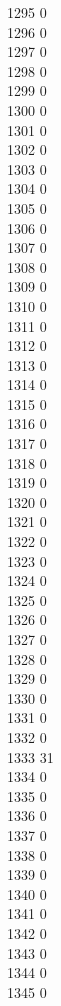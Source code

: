 { 1295	0 \\
 1296	0 \\
 1297	0 \\
 1298	0 \\
 1299	0 \\
 1300	0 \\
 1301	0 \\
 1302	0 \\
 1303	0 \\
 1304	0 \\
 1305	0 \\
 1306	0 \\
 1307	0 \\
 1308	0 \\
 1309	0 \\
 1310	0 \\
 1311	0 \\
 1312	0 \\
 1313	0 \\
 1314	0 \\
 1315	0 \\
 1316	0 \\
 1317	0 \\
 1318	0 \\
 1319	0 \\
 1320	0 \\
 1321	0 \\
 1322	0 \\
 1323	0 \\
 1324	0 \\
 1325	0 \\
 1326	0 \\
 1327	0 \\
 1328	0 \\
 1329	0 \\
 1330	0 \\
 1331	0 \\
 1332	0 \\
 1333	31 \\
 1334	0 \\
 1335	0 \\
 1336	0 \\
 1337	0 \\
 1338	0 \\
 1339	0 \\
 1340	0 \\
 1341	0 \\
 1342	0 \\
 1343	0 \\
 1344	0 \\
 1345	0 \\
}
